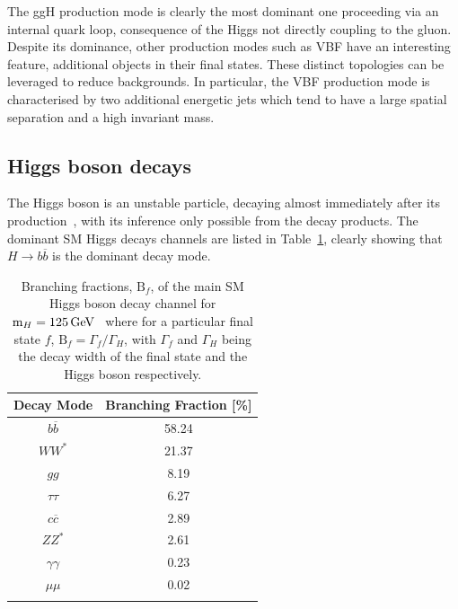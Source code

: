 The ggH production mode is clearly the most dominant one proceeding via an internal quark loop, consequence of the Higgs not directly coupling to the gluon. Despite its dominance, other production modes such as VBF have an interesting feature, additional objects in their final states. These distinct topologies can be leveraged to reduce backgrounds. In particular, the VBF production mode is characterised by two additional energetic jets which tend to have a large spatial separation and a high invariant mass.

\subsection{Higgs boson decays}

The Higgs boson is an unstable particle, decaying almost immediately after its production~\cite{HiggsUnstable}, with its inference only possible from the decay products. The dominant SM Higgs decays channels are listed in Table~\ref{Table:Introduction_HiggsBranchingFractions}, clearly showing that $H\rightarrow b\overline{b}$ is the dominant decay mode. 

\begin{table}[h]
\centering
\renewcommand{\arraystretch}{1.5} %
\setlength{\tabcolsep}{12pt} %
\begin{tabular}{|c|c|}
\hline
Decay Mode                  & Branching Fraction {[}\%{]} \\ \hline \hline
$b\overline{b}$             & 58.24 \\ 
\arrayrulecolor{lightgray} \hline
$WW^*$                      & 21.37 \\ 
\arrayrulecolor{lightgray} \hline
$gg$                        & 8.19  \\ 
\arrayrulecolor{lightgray} \hline
$\tau\tau$                  & 6.27  \\ 
\arrayrulecolor{lightgray} \hline
$c\overline{c}$             & 2.89  \\ 
\arrayrulecolor{lightgray} \hline
$ZZ^*$                      & 2.61  \\ 
\arrayrulecolor{lightgray} \hline
$\gamma\gamma$              & 0.23  \\ 
\arrayrulecolor{lightgray} \hline
$\mu\mu$                    & 0.02  \\ 
\arrayrulecolor{black} \hline
\end{tabular}
\caption{Branching fractions, $\text{B}_f$, of the main SM Higgs boson decay channel for $\text{m}_H = 125\,\text{Ge\hspace{-.08em}V}$~\cite{HiggsProduction_XS} where for a particular final state $f$, $\text{B}_f = \Gamma_f/\Gamma_H$, with $\Gamma_f$ and $\Gamma_H$ being the decay width of the final state and the Higgs boson respectively.}
\label{Table:Introduction_HiggsBranchingFractions}
\end{table}


